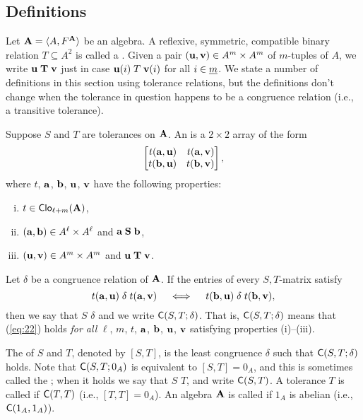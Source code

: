 \subsection{Definitions} %
Let $\mathbf{A} = \langle A, F^{\mathbf{A}}\rangle$ be an algebra.
A reflexive, symmetric, compatible binary relation $T\subseteq A^2$ is called a
.  
Given a pair $(\mathbf{u}, \mathbf{v}) \in A^m\times A^m$ of $m$-tuples of $A$, we write 
$\mathbf{u} \mathrel{\mathbf{T}} \mathbf{v}$ just in case $\mathbf{u}(i) \mathrel{T} \mathbf{v}(i)$ for all $i\in \underline{m}$. 
We state a number of definitions in this section using tolerance relations, but 
the definitions don't change when the tolerance in question happens to be
a congruence relation (i.e., a transitive tolerance).

Suppose $S$ and $T$ are tolerances on $\mathbf{A}$.  An  
is a $2\times 2$ array of the form
\[
\begin{bmatrix*}[r] t(\ba,\bu) & t(\ba,\bv)\\ t(\bb,\bu)&t(\bb,\bv)\end{bmatrix*},
\]
where $t$, $\mathbf{a}$, $\mathbf{b}$, $\mathbf{u}$, $\mathbf{v}$ have the following properties:
\begin{enumerate}[(i)]
\item $t\in \operatorname{\mathsf{Clo}}_{\ell + m}(\mathbf{A})$,
\item $(\mathbf{a}, \mathbf{b})\in A^\ell\times A^\ell$ and $\mathbf{a} \mathrel{\mathbf{S}} \mathbf{b}$,
\item $(\mathbf{u}, \mathbf{v})\in A^m\times A^m$ and $\mathbf{u} \mathrel{\mathbf{T}} \mathbf{v}$.
\end{enumerate}
Let $\delta$ be a congruence relation of $\mathbf{A}$.
If the entries of every $S,T$-matrix satisfy
\begin{equation}
  \label{eq:22}
t(\ba,\bu) \mathrel{\delta} t(\ba,\bv)\quad \iff \quad t(\bb,\bu) \mathrel{\delta} t(\bb,\bv),
\end{equation}
then we say that $S$  $\delta$ and we write 
$\mathsf{C}(S, T; \delta)$.
That is, $\mathsf{C}(S, T; \delta)$  means that 
(\ref{eq:22}) holds \emph{for all}
$\ell$, $m$, $t$, $\mathbf{a}$, $\mathbf{b}$, $\mathbf{u}$, $\mathbf{v}$ satisfying properties (i)--(iii).

The  of $S$ and $T$, denoted by $[S, T]$,
is the least congruence $\delta$ such that $\mathsf{C}(S, T; \delta)$ 
holds.  
Note that $\mathsf{C}(S, T; 0_A)$ is equivalent to $[S,T] = 0_A$, and this
is sometimes called the ;
when it holds we say  that
$S$  $T$, and write $\mathsf{C}(S, T)$.  %
A tolerance $T$ is called  if
$\mathsf{C}(T, T)$ (i.e., $[T, T] = 0_A$).  
An algebra $\mathbf{A}$ is called  if $1_A$ is abelian
(i.e., $\mathsf{C}(1_A, 1_A)$). %

